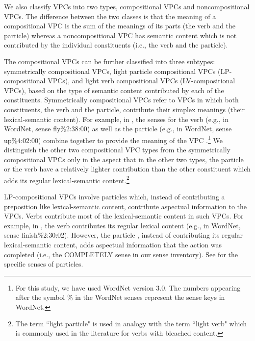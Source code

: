 \documentclass[output=paper,modfonts,nonflat]{langsci/langscibook}
\begin{document}
We also classify VPCs into two types, compositional VPCs and noncompositional VPCs. The difference between the two classes is that the meaning of a compositional VPC is the sum of the meanings of its parts (the verb and the particle) whereas a noncompositional VPC %
has semantic content which is not contributed by the individual constituents (i.e., the verb and the particle). 

The compositional VPCs can be further classified into three subtypes: symmetrically compositional VPCs, light particle compositional VPCs (LP-compositional VPCs), and light verb compositional VPCs (LV-compositional VPCs), based on the type of semantic content contributed by each of the constituents. Symmetrically compositional VPCs refer to VPCs in which both constituents, the verb and the particle, contribute their simplex meanings (their lexical-semantic content). For example, in , the senses for the verb  (e.g., in WordNet, sense fly\%2:38:00) as well as the particle  (e.g., in WordNet, sense up\%4:02:00) combine together to provide the meaning of the VPC .\footnote{For this study, we have used WordNet version 3.0. The numbers appearing after the symbol \% in the WordNet senses represent the sense keys in WordNet.} We distinguish the other two compositional VPC types from the symmetrically compositional VPCs only in the aspect that in the other two types, the particle or the verb have a relatively lighter contribution than the other constituent which adds its regular lexical-semantic content.\footnote{The term ``light particle" is used in analogy with the term ``light verb" which is commonly used in the literature for verbs with bleached content.} 

LP-compositional VPCs involve particles which, instead of contributing a pre\-position like lexical-semantic content, contribute aspectual information to the VPCs. Verbs contribute most of the lexical-semantic content in such VPCs. For example, in  \citep{Ban03b}, the verb  contributes its regular lexical content (e.g., in WordNet, sense finish\%2:30:02). However, the particle , instead of contributing its regular lexical-semantic content, adds aspectual information that the action was completed (i.e., the COMPLETELY sense in our sense inventory). See  for the specific senses of particles. 
\end{document}
